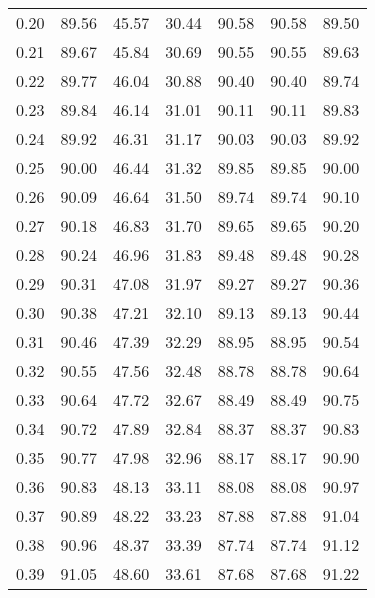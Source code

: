 \begin{tabular}{|c|c|c|c|c|c|c|}
      0.20 &     89.56 &     45.57 &      30.44 &   90.58 &      90.58 &         89.50 \\
      0.21 &     89.67 &     45.84 &      30.69 &   90.55 &      90.55 &         89.63 \\
      0.22 &     89.77 &     46.04 &      30.88 &   90.40 &      90.40 &         89.74 \\
      0.23 &     89.84 &     46.14 &      31.01 &   90.11 &      90.11 &         89.83 \\
      0.24 &     89.92 &     46.31 &      31.17 &   90.03 &      90.03 &         89.92 \\
      0.25 &     90.00 &     46.44 &      31.32 &   89.85 &      89.85 &         90.00 \\
      0.26 &     90.09 &     46.64 &      31.50 &   89.74 &      89.74 &         90.10 \\
      0.27 &     90.18 &     46.83 &      31.70 &   89.65 &      89.65 &         90.20 \\
      0.28 &     90.24 &     46.96 &      31.83 &   89.48 &      89.48 &         90.28 \\
      0.29 &     90.31 &     47.08 &      31.97 &   89.27 &      89.27 &         90.36 \\
      0.30 &     90.38 &     47.21 &      32.10 &   89.13 &      89.13 &         90.44 \\
      0.31 &     90.46 &     47.39 &      32.29 &   88.95 &      88.95 &         90.54 \\
      0.32 &     90.55 &     47.56 &      32.48 &   88.78 &      88.78 &         90.64 \\
      0.33 &     90.64 &     47.72 &      32.67 &   88.49 &      88.49 &         90.75 \\
      0.34 &     90.72 &     47.89 &      32.84 &   88.37 &      88.37 &         90.83 \\
      0.35 &     90.77 &     47.98 &      32.96 &   88.17 &      88.17 &         90.90 \\
      0.36 &     90.83 &     48.13 &      33.11 &   88.08 &      88.08 &         90.97 \\
      0.37 &     90.89 &     48.22 &      33.23 &   87.88 &      87.88 &         91.04 \\
      0.38 &     90.96 &     48.37 &      33.39 &   87.74 &      87.74 &         91.12 \\
      0.39 &     91.05 &     48.60 &      33.61 &   87.68 &      87.68 &         91.22 \\

\end{tabular}
